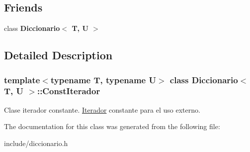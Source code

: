 \subsection*{Friends}
\begin{DoxyCompactItemize}
\item 
\mbox{\label{classDiccionario_1_1ConstIterador_ae50c4dcf749ac5c49596da52815dfa85}} 
class {\bfseries Diccionario$<$ T, U $>$}
\end{DoxyCompactItemize}


\subsection{Detailed Description}
\subsubsection*{template$<$typename T, typename U$>$\newline
class Diccionario$<$ T, U $>$\+::\+Const\+Iterador}

Clase iterador constante. \hyperlink{classDiccionario_1_1Iterador}{Iterador} constante para el uso externo. 

The documentation for this class was generated from the following file\+:\begin{DoxyCompactItemize}
\item 
include/diccionario.\+h\end{DoxyCompactItemize}
